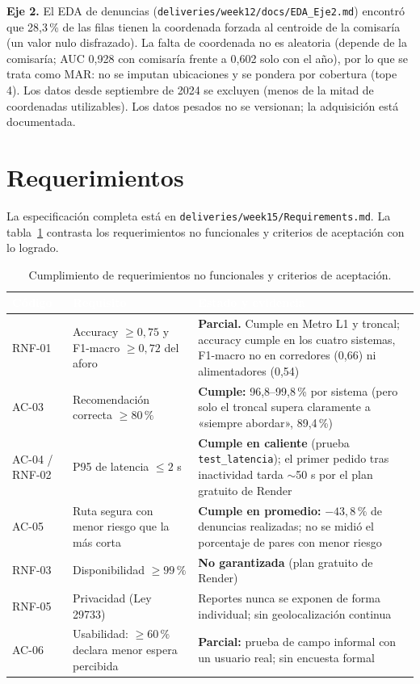 \documentclass[11pt]{article}
\newcommand{\code}[1]{\texttt{#1}}
\begin{document}
\textbf{Eje 2.} El EDA de denuncias (\code{deliveries/week12/docs/EDA\_Eje2.md}) encontró que
28,3\,\% de las filas tienen la coordenada forzada al centroide de la comisaría (un valor nulo
disfrazado). La falta de coordenada no es aleatoria (depende de la comisaría; AUC 0,928 con comisaría
frente a 0,602 solo con el año), por lo que se trata como MAR: no se imputan ubicaciones y se
pondera por cobertura (tope 4). Los datos desde septiembre de 2024 se excluyen (menos de la mitad de
coordenadas utilizables). Los datos pesados no se versionan; la adquisición está documentada.

\section{Requerimientos}

La especificación completa está en \code{deliveries/week15/Requirements.md}. La
tabla~\ref{tab:req} contrasta los requerimientos no funcionales y criterios de aceptación con lo
logrado.

\begin{table}[H]
\centering\small
\begin{tabularx}{\textwidth}{@{}p{1.5cm}Xp{4.6cm}@{}}
\toprule
\rowcolor{tablehead} \textcolor{white}{\bfseries Código} & \textcolor{white}{\bfseries Requisito} & \textcolor{white}{\bfseries Estado y evidencia} \\
\midrule
RNF-01 & Accuracy $\ge 0{,}75$ y F1-macro $\ge 0{,}72$ del aforo & \textbf{Parcial.} Cumple en Metro L1 y troncal; accuracy cumple en los cuatro sistemas, F1-macro no en corredores (0,66) ni alimentadores (0,54) \\
\rowcolor{tablerow} AC-03 & Recomendación correcta $\ge 80\,\%$ & \textbf{Cumple:} 96,8--99,8\,\% por sistema (pero solo el troncal supera claramente a «siempre abordar», 89,4\,\%) \\
AC-04 / RNF-02 & P95 de latencia $\le 2$ s & \textbf{Cumple en caliente} (prueba \code{test\_latencia}); el primer pedido tras inactividad tarda $\sim$50 s por el plan gratuito de Render \\
\rowcolor{tablerow} AC-05 & Ruta segura con menor riesgo que la más corta & \textbf{Cumple en promedio:} $-43{,}8\,\%$ de denuncias realizadas; no se midió el porcentaje de pares con menor riesgo \\
RNF-03 & Disponibilidad $\ge 99\,\%$ & \textbf{No garantizada} (plan gratuito de Render) \\
\rowcolor{tablerow} RNF-05 & Privacidad (Ley 29733) & Reportes nunca se exponen de forma individual; sin geolocalización continua \\
AC-06 & Usabilidad: $\ge 60\,\%$ declara menor espera percibida & \textbf{Parcial:} prueba de campo informal con un usuario real; sin encuesta formal \\
\bottomrule
\end{tabularx}
\caption{Cumplimiento de requerimientos no funcionales y criterios de aceptación.}
\label{tab:req}
\end{table}
\end{document}
